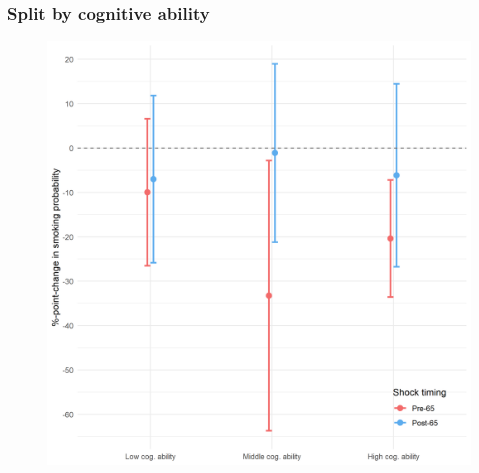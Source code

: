 \documentclass[10pt,compress,xcolor=dvipsnames,aspectratio=169]{beamer}    %
\newcounter{ex}
\newcommand{\1}[1]{\mathrm{1\hspace*{-2.5pt}l}[#1]}	%
\begin{document}
\begin{frame}
\frametitle{Split by cognitive ability}

\begin{figure}[hbtp]
\centering
\includegraphics[height=0.8\textheight]{../../3_output/shock_effects/cog_6070_100_cv.png}
\label{fig:cog}
\end{figure}
\hyperlink{frame:otherX}{}
\end{frame}
\end{document}
